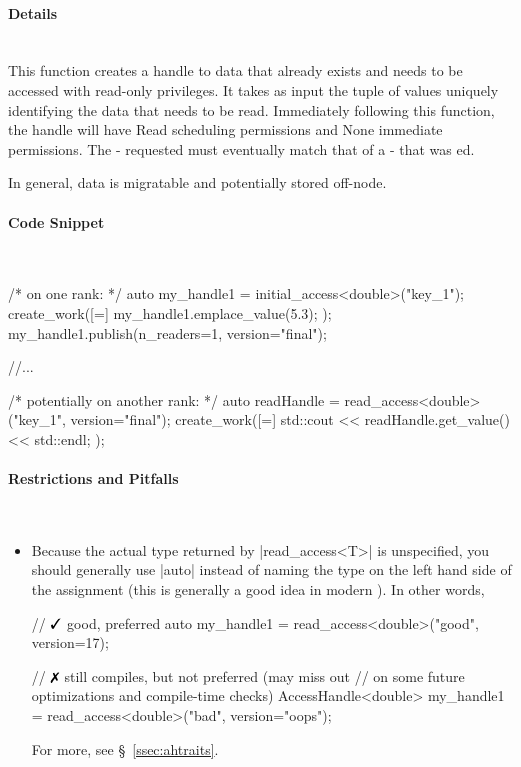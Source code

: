 \paragraph{Details}\mbox{}\\
This function creates a \gls{handle} to data that already exists and 
needs to be accessed with read-only privileges. 
It takes as input the \gls{tuple} of values uniquely 
identifying the data that needs to be read.
Immediately following this function, the \gls{handle} will have Read
\gls{scheduling permissions} and None \gls{immediate permissions}.
The - requested must eventually match that of a
- that was ed.

In general,  data is migratable and potentially stored off-node.

\paragraph{Code Snippet}\mbox{}\\
\begin{CppCodeNumb}
/* on one rank: */
auto my_handle1 = initial_access<double>("key_1");
create_work([=]{
  my_handle1.emplace_value(5.3);
});
my_handle1.publish(n_readers=1, version="final");

//...

/* potentially on another rank: */
auto readHandle = read_access<double>("key_1", version="final");
create_work([=]{
  std::cout << readHandle.get_value() << std::endl;
});
\end{CppCodeNumb}

\paragraph{Restrictions and Pitfalls}\mbox{}\\ 
\begin{itemize}
  \item Because the actual type returned by |read_access<T>| is
  unspecified, you should generally use |auto| instead of naming the type on 
  the left hand side of the assignment (this is generally a good idea in modern
  \CC{}). In other words,
  \begin{CppCode}
	// $\yes$ good, preferred
	auto my_handle1 = read_access<double>("good", version=17); 

	// $\no$ still compiles, but not preferred (may miss out
	//  on some future optimizations and compile-time checks)
	AccessHandle<double> my_handle1 = read_access<double>("bad", version="oops"); 
  \end{CppCode}
  For more, see \S~\ref{ssec:ahtraits}.
\end{itemize}